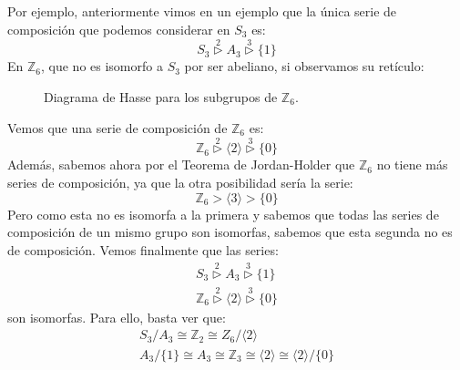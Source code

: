 \begin{ejemplo}
    Por ejemplo, anteriormente vimos en un ejemplo que la única serie de composición que podemos considerar en $S_3$ es:
    \begin{equation*}
        S_3 \stackrel{2}{\rhd} A_3 \stackrel{3}{\rhd} \{1\}
    \end{equation*}
    En $\mathbb{Z}_6$, que no es isomorfo a $S_3$ por ser abeliano, si observamos su retículo:
            \begin{figure}[H]
                \centering
                \caption{Diagrama de Hasse para los subgrupos de $\mathbb{Z}_6$.}
            \end{figure}
            Vemos que una serie de composición de $\mathbb{Z}_6$ es:
            \begin{equation*}
                \mathbb{Z}_6 \stackrel{2}{\rhd} \langle 2 \rangle  \stackrel{3}{\rhd} \{0\}
            \end{equation*}
            Además, sabemos ahora por el Teorema de Jordan-Holder que $\mathbb{Z}_6$ no tiene más series de composición, ya que la otra posibilidad sería la serie:
            \begin{equation*}
                \mathbb{Z}_6 > \langle 3 \rangle > \{0\}
            \end{equation*}
            Pero como esta no es isomorfa a la primera y sabemos que todas las series de composición de un mismo grupo son isomorfas, sabemos que esta segunda no es de composición. Vemos finalmente que las series:
            \begin{gather*}
                S_3 \stackrel{2}{\rhd} A_3 \stackrel{3}{\rhd} \{1\} \\
                \mathbb{Z}_6 \stackrel{2}{\rhd} \langle 2 \rangle  \stackrel{3}{\rhd} \{0\} 
            \end{gather*}
            son isomorfas. Para ello, basta ver que:
            \begin{gather*}
                S_3/A_3 \cong \mathbb{Z}_2 \cong Z_6/\langle 2 \rangle  \\
                A_3/\{1\} \cong A_3 \cong \mathbb{Z}_3 \cong \langle 2 \rangle  \cong \langle 2 \rangle /\{0\}
            \end{gather*}
\end{ejemplo}

